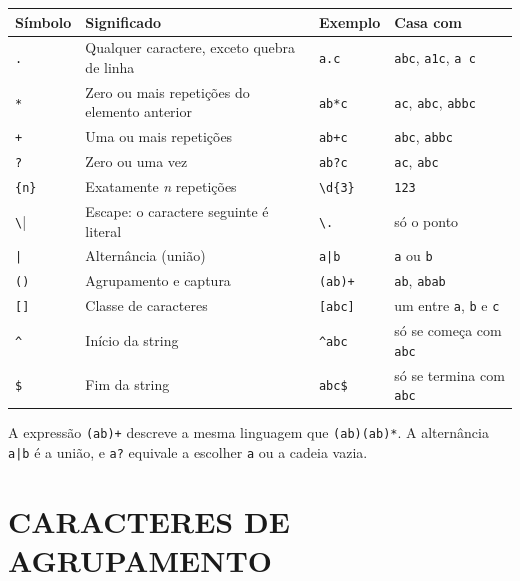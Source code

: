 \documentclass[
    12pt,
    oneside,
    a4paper,
    chapter=TITLE,
    section=TITLE,
    sumario=abnt-6027-2012
]{abntex2}
\begin{document}
\begin{quadro}[!h]
    \centering
    \small
    \begin{tabular}{|p{2.1cm}|p{4.8cm}|p{2.7cm}|p{3.6cm}|}
        \hline
        \textbf{Símbolo} & \textbf{Significado} & \textbf{Exemplo} & \textbf{Casa com} \\
        \hline
        \hline
        \verb|.| & Qualquer caractere, exceto quebra de linha & \verb|a.c| & \texttt{abc}, \texttt{a1c}, \texttt{a c} \\
        \hline
        \verb|*| & Zero ou mais repetições do elemento anterior & \verb|ab*c| & \texttt{ac}, \texttt{abc}, \texttt{abbc} \\
        \hline
        \verb|+| & Uma ou mais repetições & \verb|ab+c| & \texttt{abc}, \texttt{abbc} \\
        \hline
        \verb|?| & Zero ou uma vez & \verb|ab?c| & \texttt{ac}, \texttt{abc} \\
        \hline
        \verb|{n}| & Exatamente \textit{n} repetições & \verb|\d{3}| & \texttt{123} \\
        \hline
        \verb|\| & Escape: o caractere seguinte é literal & \verb|\.| & só o ponto \\
        \hline
        \verb+|+ & Alternância (união) & \verb+a|b+ & \texttt{a} ou \texttt{b} \\
        \hline
        \verb|()| & Agrupamento e captura & \verb|(ab)+| & \texttt{ab}, \texttt{abab} \\
        \hline
        \verb|[]| & Classe de caracteres & \verb|[abc]| & um entre \texttt{a}, \texttt{b} e \texttt{c} \\
        \hline
        \verb|^| & Início da string & \verb|^abc| & só se começa com \texttt{abc} \\
        \hline
        \verb|$| & Fim da string & \verb|abc$| & só se termina com \texttt{abc} \\
        \hline
    \end{tabular}
\end{quadro}

A expressão \verb|(ab)+| descreve a mesma linguagem que \verb|(ab)(ab)*|. A alternância \verb+a|b+ é a união, e \verb|a?| equivale a escolher \texttt{a} ou a cadeia vazia.

\section{CARACTERES DE AGRUPAMENTO}
\label{sec:grupos}
\end{document}

